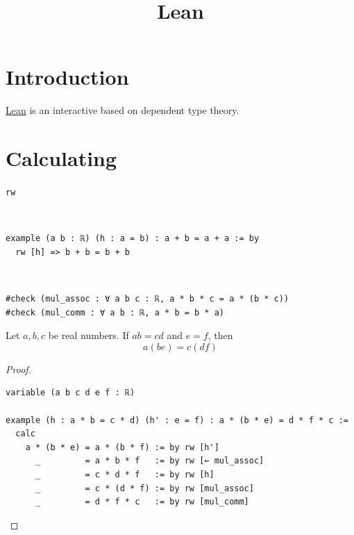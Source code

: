 \documentclass{blog}
\title{Lean}
\begin{document}
\maketitle
\tableofcontents

\section{Introduction}
\begin{definition}[lean]
  \href{https://lean-lang.org/doc/reference/latest/}{Lean}
  is an interactive  based on
  dependent type theory.
\end{definition}

\section{Calculating}
\begin{definition}[rw]
  \verb|rw|
\end{definition}

\begin{example}~
  \begin{verbatim}
example (a b : ℝ) (h : a = b) : a + b = a + a := by
  rw [h] => b + b = b + b
  \end{verbatim}
\end{example}

\begin{definition}~
  \begin{verbatim}
#check (mul_assoc : ∀ a b c : ℝ, a * b * c = a * (b * c))
#check (mul_comm : ∀ a b : ℝ, a * b = b * a)
\end{verbatim}
\end{definition}

\begin{example}
  Let $a, b, c$ be real numbers.
  If $a b = c d$ and $e = f$, then
  \begin{equation*}
    a (b e) = c (d f)
  \end{equation*}
\end{example}

\begin{proof}~
  \begin{verbatim}
variable (a b c d e f : ℝ)

example (h : a * b = c * d) (h' : e = f) : a * (b * e) = d * f * c :=
  calc
    a * (b * e) = a * (b * f) := by rw [h']
      _         = a * b * f   := by rw [← mul_assoc]
      _         = c * d * f   := by rw [h]
      _         = c * (d * f) := by rw [mul_assoc]
      _         = d * f * c   := by rw [mul_comm]
\end{verbatim}
\end{proof}
\end{document}
